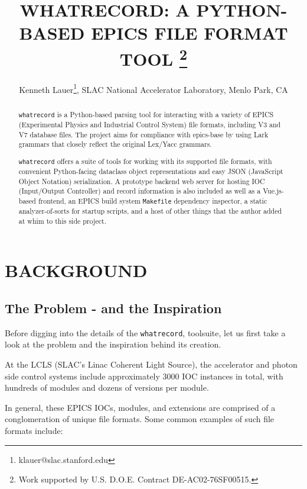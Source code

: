 \documentclass[letter,
               keeplastbox,   %
               ]{jacow}
\begin{document}
\title{WHATRECORD: A PYTHON-BASED EPICS FILE FORMAT TOOL
\thanks{Work supported by U.S. D.O.E. Contract DE-AC02-76SF00515.}}
\author{Kenneth Lauer\thanks{klauer@slac.stanford.edu}, SLAC National Accelerator Laboratory, Menlo Park, CA }
	
\maketitle

%
\begin{abstract}
  \verb_whatrecord_ is a Python-based parsing tool for
  interacting with a variety of EPICS (Experimental Physics and Industrial
  Control System) file formats, including V3 and V7 database files. The project
  aims for compliance with epics-base by using Lark grammars that
  closely reflect the original Lex/Yacc grammars. 

  \verb_whatrecord_ offers a suite of tools for working with its supported file
  formats, with convenient Python-facing dataclass object representations and
  easy JSON (JavaScript Object Notation) serialization. A prototype backend web
  server for hosting IOC (Input/Output Controller) and record information is
  also included as well as a Vue.js-based frontend, an EPICS build system
  \verb_Makefile_ dependency inspector, a static analyzer-of-sorts for startup
  scripts, and a host of other things that the author added at whim to this
  side project.
\end{abstract}

\section{BACKGROUND}

\subsection{The Problem - and the Inspiration}

Before digging into the details of the
\verb_whatrecord_\cite{whatrecord-github}, toolsuite, let us first take a look
at the problem and the inspiration behind its creation.

At the LCLS (SLAC's Linac Coherent Light Source), the accelerator and photon
side control systems include approximately 3000 IOC instances in total, with
hundreds of modules and dozens of versions per module.

In general, these EPICS\cite{epics-base} IOCs, modules, and extensions are
comprised of a conglomeration of unique file formats. Some common examples of
such file formats include:
\end{document}
